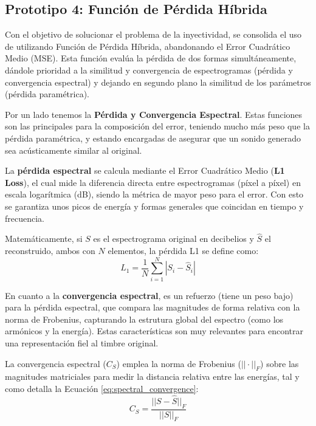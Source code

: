 \subsection{Prototipo 4: Función de Pérdida Híbrida}
Con el objetivo de solucionar el problema de la inyectividad, se consolida el uso de utilizando
Función de Pérdida Híbrida, abandonando el Error Cuadrático Medio (MSE). Esta función evalúa la pérdida
de dos formas simultáneamente, dándole prioridad a la similitud y convergencia de espectrogramas (pérdida y convergencia espectral)
y dejando en segundo plano la similitud de los parámetros (pérdida paramétrica).

Por un lado tenemos la \textbf{Pérdida y Convergencia Espectral}. Estas funciones son las principales
para la composición del error, teniendo mucho más peso que la pérdida paramétrica, y estando encargadas de asegurar
que un sonido generado sea acústicamente similar al original. 

La \textbf{pérdida espectral} se calcula mediante el Error Cuadrático Medio (\textbf{L1 Loss}), el cual mide la diferencia directa entre 
espectrogramas (píxel a píxel) en escala logarítmica (dB), siendo la métrica de mayor peso para el error. Con esto se garantiza unos picos de energía y
formas generales que coincidan en tiempo y frecuencia.

Matemáticamente, si $S$ es el espectrograma original en decibelios y $\hat{S}$ el reconstruido, ambos con $N$ elementos, la pérdida L1 se define como:
\begin{equation}
L_1 = \frac{1}{N} \sum_{i=1}^{N} |S_i - \hat{S}_i|
\label{eq:l1_loss}
\end{equation}

En cuanto a la \textbf{convergencia espectral}, es un refuerzo (tiene un peso bajo) para la pérdida espectral, que compara las magnitudes de forma relativa con la norma de
Frobenius, capturando la estrutura global del espectro (como los armónicos y la energía). Estas características 
son muy relevantes para encontrar una representación fiel al timbre original. 

La convergencia espectral ($C_S$) emplea la norma de Frobenius ($||\cdot||_F$) sobre las magnitudes matriciales para medir la distancia relativa entre las energías, tal y como detalla la Ecuación \ref{eq:spectral_convergence}:
\begin{equation}
C_S = \frac{||S - \hat{S}||_F}{||S||_F}
\label{eq:spectral_convergence}
\end{equation}

